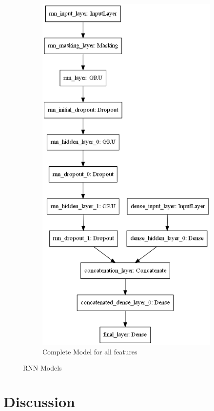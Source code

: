 \documentclass[acmsmall]{acmart}
\begin{document}
\begin{figure}[H]
\begin{subfigure}{.5\textwidth}
\centering
  \includegraphics[width=.9\linewidth]{assets/AuthorAttributionModel_all_features.png}
  \caption{Complete Model for all features}
    \label{fig:complete_model}
 \end{subfigure}
 \caption{RNN Models}
\label{fig:rnn_models}
\end{figure}


\section{Discussion}
\end{document}
